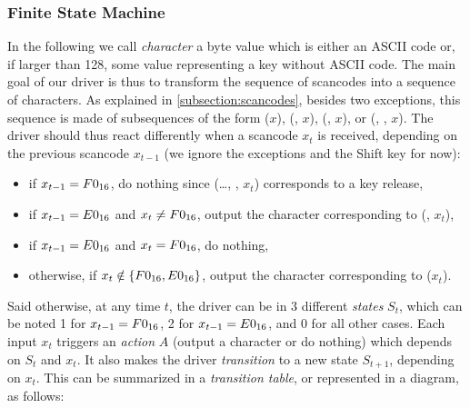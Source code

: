 \subsubsection{Finite State Machine}

In the following we call {\em character} a byte value which is either an ASCII
code or, if larger than 128, some value representing a key without ASCII code.
The main goal of our driver is thus to transform the sequence of scancodes into
a sequence of characters. As explained in \cref{subsection:scancodes}, besides
two exceptions, this sequence is made of subsequences of the form ($x$),
(, $x$), (, $x$), or (, , $x$). The driver
should thus react differently when a scancode $x_t$ is received, depending on
the previous scancode $x_{t-1}$ (we ignore the exceptions and the Shift key for
now):

\begin{itemize}
  \item if $x_{t-1} = F0_{16}$, do nothing since (\ldots, , $x_t$)
  corresponds to a key release,

  \item if $x_{t-1} = E0_{16}$ and $x_t \ne F0_{16}$, output the character
  corresponding to (, $x_t$),

  \item if $x_{t-1} = E0_{16}$ and $x_t = F0_{16}$, do nothing,

  \item otherwise, if $x_t \notin \{F0_{16}, E0_{16}\}$, output the
  character corresponding to ($x_t$).
\end{itemize}

Said otherwise, at any time $t$, the driver can be in 3 different {\em states}
$S_t$, which can be noted 1 for $x_{t-1}=F0_{16}$, 2 for $x_{t-1}=E0_{16}$,
and 0 for all other cases. Each input $x_t$ triggers an {\em action} $A$
(output a character or do nothing) which depends on $S_t$ and $x_t$. It also
makes the driver {\em transition} to a new state $S_{t+1}$, depending on $x_t$.
This can be summarized in a {\em transition table}, or represented in a
diagram, as follows:

